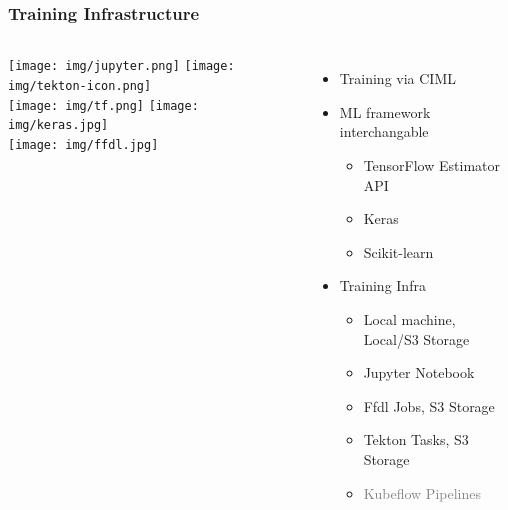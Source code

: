 \documentclass[aspectratio=169,11pt,hyperref={colorlinks=true}]{beamer}
\newcommand{\light}[1]{\textcolor{gray}{#1}}
\begin{document}
\begin{frame}
    \frametitle{Training Infrastructure}
    \begin{columns}
        \begin{centering}
          \texttt{[image: img/jupyter.png]}
          \hspace{0.13\columnwidth}
          \texttt{[image: img/tekton-icon.png]} \\
          \vspace{0.02\columnwidth}
          \texttt{[image: img/tf.png]}
          \hspace{0.13\columnwidth}
          \texttt{[image: img/keras.jpg]} \\
          \vspace{0.02\columnwidth}
          \texttt{[image: img/ffdl.jpg]} \\
        \end{centering}
        \begin{itemize}
          \item{Training via CIML}
          \item{ML framework interchangable}
          \begin{itemize}
            \item{TensorFlow Estimator API}
            \item{Keras}
            \item{Scikit-learn}
          \end{itemize}
          \item{Training Infra}
          \begin{itemize}
            \item{Local machine, Local/S3 Storage}
            \item{Jupyter Notebook}
            \item{Ffdl Jobs, S3 Storage}
            \item{Tekton Tasks, S3 Storage}
            \item{\light{Kubeflow Pipelines}}
          \end{itemize}
        \end{itemize}
    \end{columns}
\end{frame}
\end{document}
